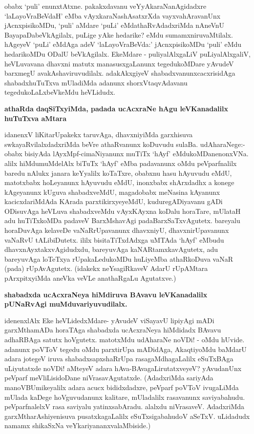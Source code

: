 obabx `puli' enunxtAtxne. pakakxdavanu veYyAkaraNanAgidadxre `laLayoVraBeVdaH' eMba vAyxkaraNashAsatxrXda vayxvahAravanUnx jAcnxpisikoMDu, `puli' aMdare `puLi' eMdathaRvAdadxriMda nAneVnU BayapaDabeVkAgilalx, puLige yAke hedarike? eMdu sumamxniruvaMtilalx. hAgeyeV `puLi' eMdAga adeV `laLayoVraBeVda:' jAcnxpisikoMDu `puli' eMdu hedarikoMDu ODalU beVkAgilalx. EkeMdare - puliyalAlxgaLiV puLiyalAlxgaliV, heVLuvavana dhavxni matutx manasusxgaLanunx tegedukoMDare yAvudeV barxmegU avakAshaviruvudilalx. adakAkxgiyeV shabadxvanunxcacxrisidAga shabadxhuTuTxva mUladiMda adanunx shorxVtaqvAdavanu tegedukoLaLxbeVkeMdu heVLidudx.

\noindent
{\bf\large{athaRda daqSiTxyiMda, padada ucAcxraNe hAgu leVKanadalilx huTuTxva aMtara}}

idanenxV liKitarUpakekx taruvAga, dhavxniyiMda garxhisuva swkayaRvilalxdadxriMda beVre athaRvanunx koDuvudu sulaBa. udAharaNege:- obabx bisiyAda lAyxMpf-cimaNiyanunx muTiTx `hAyf' eMdukoMDanenonxVNa. alilx hiMdumuMdelAlx biTuTx `hAyf' eMba padavanunx oMdu peVparfnalilx baredu nAlukx janara keYyalilx koTaTxre, obabxnu hasu hAyuvudu eMdU, matotxbabx hoLeyanunx hAyuvudu eMdU, inonxbabx shArxdadhx a konege kAgeyanunx kUguva shabadxveMdU, magadobabx meNasina kAyanunx kacicxdariMdAda KArada parxtikirxyeyeMdU, kuduregADiyavanu gADi ODisuvAga heVLuva shabadxveMdu vAyxKAyxna koDalu horaTare, mUlataH adu huTiTxkoMDa padaveV BarxMshavAgi padaBarxSaTxvAgutetx. bareyalu horaDuvAga kelaveDe vaNaRrUpavanunx dhavxniyU, dhavxnirUpavanunx vaNaRvU tALibiDutetx. ililx bisitaTiTxdAdxga uMTAda `hAyf' eMbudu dhavxnAyxtakxvAgidudxdu, bareyuvAga kaNARtamxkavAgutetx, adu bareyuvAga loTeTxya rUpakaLedukoMDu  huLiyeMba athaRkoDuva vaNaR (pada) rUpAvAgutetx. (idakekx neYsagiRkaveV AdarU rUpAMtara pArxpitxyiMda aneVka veVLe anathaRgaLu Agutatxve.) 

\noindent
{\bf\large{shabadxda ucAcxraNeya hiMdiruva BAvavu leVKanadalilx pUNaRvAgi muMduvariyuvudilalx.}}\label{page181}

idenenxlAlx Eke heVLidedxMdare- yAvudeV viSayavU lipiyAgi mADi garxMthamADa horaTAga shabadxda ucAcxraNeya hiMdidadx BAvavu adhaRBAga satutx hoVgutetx. matotxMdu udAharaNe noVDi! - oMdu hUvide. adanunx poVToV tegedu oMdu parxtirUpa mADidAga, AkaqtiyoMdu baMdarU adara jotegeV iruva shabadxsapxshaRrUpa rasagaMdhagaLalilx eSuTxBAga uLiyutatxde noVDi! aMteyeV adara hAva-BAvagaLirutatxveyeV? yAvudanUnx peVparf meVliLisidoDane niVrasavAgutatxde. (AdadxriMda sariyAda manoVBUmikeyalilx adara acucx bididxdadxre, peVparf poVToV ivugaLiMda mUlada kaDege hoVguvudanunx kalitare, mUladalilx rasavanunx saviyabahudu. peVparfnalelxV rasa saviyalu yatinxsabAradu. alalxdu niVrasaveV. AdadxriMda garxMtharAshiyenisuva pusatxkagaLalilx eSuTxsigabahudoV aSeTxV. uLidadudx namamx shikaSxNa veYkariyananxvalaMbiside.)

